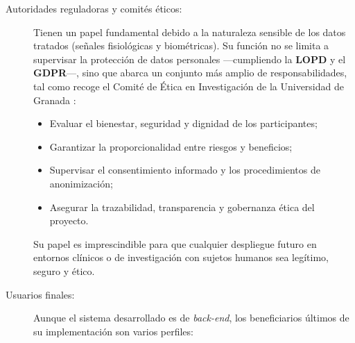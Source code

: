 \documentclass{report}
\begin{document}
\begin{description}
  \item[Autoridades reguladoras y comités éticos:]  
  Tienen un papel fundamental debido a la naturaleza sensible de los datos tratados (señales fisiológicas y biométricas).  
  Su función no se limita a supervisar la protección de datos personales —cumpliendo la \textbf{LOPD} y el \textbf{GDPR}—, sino que abarca un conjunto más amplio de responsabilidades, tal como recoge el Comité de Ética en Investigación de la Universidad de Granada \cite{ugrcomite}:  
  \begin{itemize}
      \item Evaluar el bienestar, seguridad y dignidad de los participantes;  
      \item Garantizar la proporcionalidad entre riesgos y beneficios;  
      \item Supervisar el consentimiento informado y los procedimientos de anonimización;  
      \item Asegurar la trazabilidad, transparencia y gobernanza ética del proyecto.  
  \end{itemize}
  Su papel es imprescindible para que cualquier despliegue futuro en entornos clínicos o de investigación con sujetos humanos sea legítimo, seguro y ético.
  \item[Usuarios finales:]  
  Aunque el sistema desarrollado es de \textit{back-end}, los beneficiarios últimos de su implementación son varios perfiles:


\end{description}
\end{document}
